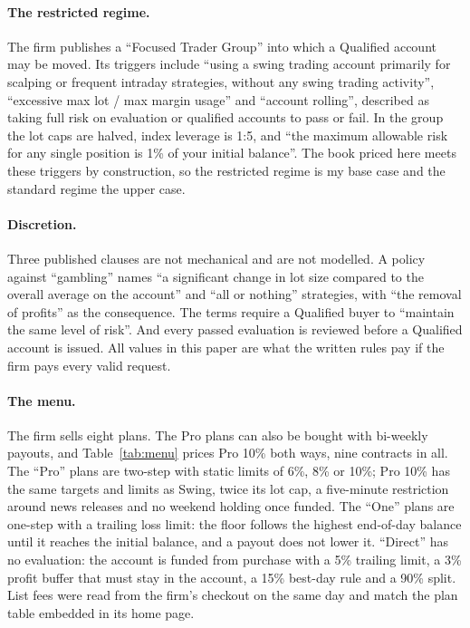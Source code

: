 \documentclass[11pt]{article}
\begin{document}
\paragraph{The restricted regime.} The firm publishes a ``Focused Trader Group'' into which a Qualified account
may be moved. Its triggers include ``using a swing trading account primarily for scalping or frequent intraday
strategies, without any swing trading activity'', ``excessive max lot / max margin usage'' and ``account
rolling'', described as taking full risk on evaluation or qualified accounts to pass or fail. In the group the
lot caps are halved, index leverage is 1:5, and ``the maximum allowable risk for any single position is 1\% of
your initial balance''. The book priced here meets these triggers by construction, so the restricted regime is
my base case and the standard regime the upper case.

\paragraph{Discretion.} Three published clauses are not mechanical and are not modelled. A policy against
``gambling'' names ``a significant change in lot size compared to the overall average on the account'' and
``all or nothing'' strategies, with ``the removal of profits'' as the consequence. The terms require a Qualified
buyer to ``maintain the same level of risk''. And every passed evaluation is reviewed before a Qualified account
is issued. All values in this paper are what the written rules pay if the firm pays every valid request.

\paragraph{The menu.} The firm sells eight plans. The Pro plans can also be bought with bi-weekly payouts, and
Table~\ref{tab:menu} prices Pro 10\% both ways, nine contracts in all. The ``Pro'' plans
are two-step with static limits of 6\%, 8\% or 10\%; Pro 10\% has the same targets and limits as Swing, twice its
lot cap, a five-minute restriction around news releases and no weekend holding once funded. The ``One'' plans are
one-step with a trailing loss limit: the floor follows the highest end-of-day balance until it reaches the
initial balance, and a payout does not lower it. ``Direct'' has no evaluation: the account is funded from
purchase with a 5\% trailing limit, a 3\% profit buffer that must stay in the account, a 15\% best-day rule and a
90\% split. List fees were read from the firm's checkout on the same day and match the plan table embedded in
its home page.
\end{document}

